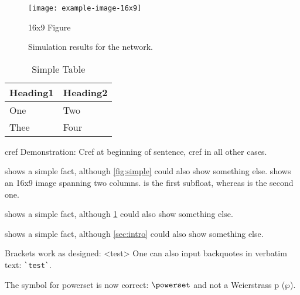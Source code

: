 \documentclass[conference]{IEEEtran}[2015/08/26]
\begin{document}
\begin{figure*}
  \centering
  \texttt{[image: example-image-16x9]}
  \caption{16x9 Figure}
  \label{fig:16x9}
\end{figure*}

\begin{figure*}[!b]
  \centering
  \hfil
  \caption{Simulation results for the network.}
  \label{fig_sim}
\end{figure*}

\begin{table}
  \caption{Simple Table}
  \label{tab:simple}
  \centering
  \begin{tabular}{ll}
    \toprule
    Heading1 & Heading2 \\
    \midrule
    One      & Two      \\
    Thee     & Four     \\
    \bottomrule
  \end{tabular}
\end{table}

cref Demonstration: Cref at beginning of sentence, cref in all other cases.

 shows a simple fact, although \cref{fig:simple} could also show something else.
 shows an 16x9 image spanning two columns.
 is the first subfloat, whereas  is the second one.

 shows a simple fact, although \cref{tab:simple} could also show something else.

 shows a simple fact, although \cref{sec:intro} could also show something else.

Brackets work as designed:
<test>
One can also input backquotes in verbatim text: \verb|`test`|.

The symbol for powerset is now correct: $\powerset$ and not a Weierstrass p ($\wp$).
\end{document}
